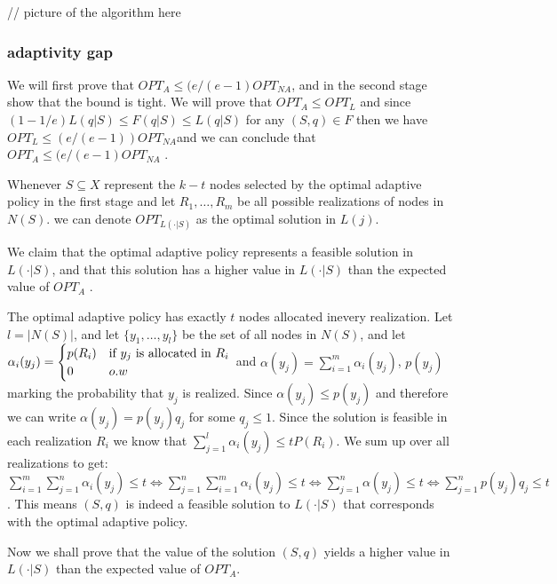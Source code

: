 // picture of the algorithm here



\subsubsection{adaptivity gap}

We will first prove that $OPT_{A}\leq(e/(e-1)OPT_{NA}$, and in the
second stage show that the bound is tight. We will prove that $OPT_{A}\leq OPT_{L}$
and since $(1-1/e)L(q|S)\leq F(q|S)\leq L(q|S)$ for any $(S,q)\in F$
then we have $OPT_{L}\leq(e/(e-1))OPT_{NA}$and we can conclude that
$OPT_{A}\leq(e/(e-1)OPT_{NA}$ .



Whenever $S\subseteq X$ represent the $k-t$ nodes selected by the
optimal adaptive policy in the first stage and let $R_{1},\ldots,R_{m}$
be all possible realizations of nodes in $N(S)$. we can denote $OPT_{L(\cdot|S)}$
as the optimal solution in $L(j)$.

We claim that the optimal adaptive policy represents a feasible solution
in $L(\cdot|S)$, and that this solution has a higher value in $L(\cdot|S)$
than the expected value of $OPT_{A}$ . 

The optimal adaptive policy has exactly $t$ nodes allocated inevery
realization. Let $l=|N(S)|$, and let $\{y_{1},\ldots,y_{l}\}$ be
the set of all nodes in $N(S)$, and let $\alpha_{i}(y_{j})=\begin{cases}
p(R_{i}) & \text{if \ensuremath{y_{j}} is allocated in \ensuremath{R_{i}}}\\
0 & o.w
\end{cases}$ and $\alpha(y_{j})=\sum_{i=1}^{m}\alpha_{i}(y_{j})$, $p(y_{j})$
marking the probability that $y_{j}$ is realized. Since $\alpha(y_{j})\leq p(y_{j})$
and therefore we can write $\alpha(y_{j})=p(y_{j})q_{j}$ for some
$q_{j}\leq1$. Since the solution is feasible in each realization
$R_{i}$ we know that $\sum_{j=1}^{l}\alpha_{i}(y_{j})\leq tP(R_{i})$.
We sum up over all realizations to get: $\sum_{i=1}^{m}\sum_{j=1}^{n}\alpha_{i}(y_{j})\leq t\Longleftrightarrow\sum_{j=1}^{n}\sum_{i=1}^{m}\alpha_{i}(y_{j})\leq t\Longleftrightarrow\sum_{j=1}^{n}\alpha(y_{j})\leq t\Longleftrightarrow\sum_{j=1}^{n}p(y_{j})q_{j}\leq t$.
This means $(S,q)$ is indeed a feasible solution to $L(\cdot|S)$
that corresponds with the optimal adaptive policy. 

Now we shall prove that the value of the solution $(S,q)$ yields
a higher value in $L(\cdot|S)$ than the expected value of $OPT_{A}$. 


